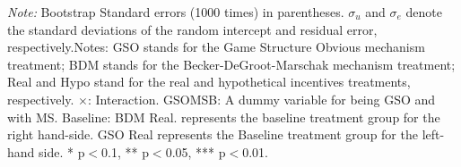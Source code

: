 \documentclass[12pt]{article}
\begin{document}
\begin{table}[H]
{\begin{tabular}{l*{1}{cc}}
    \end{tabular}
    }



\begin{tablenotes}
            \footnotesize
            \item \textit{Note:} Bootstrap Standard errors (1000 times) in parentheses. $\sigma_u$ and $\sigma_e$ denote the standard deviations of the random intercept and residual error, respectively.Notes: GSO stands for the Game Structure Obvious mechanism treatment; BDM stands for the Becker-DeGroot-Marschak mechanism treatment; Real and Hypo stand for the real and hypothetical incentives treatments, respectively. $\times$: Interaction. GSOMSB: A dummy variable for being GSO and with MS. Baseline: BDM Real. represents the baseline treatment group for the right hand-side. GSO Real represents the Baseline treatment group for the left-hand side. * p$<$0.1, ** p$<$0.05, *** p$<$0.01.
        \end{tablenotes}
\end{table}











\clearpage
\end{document}
